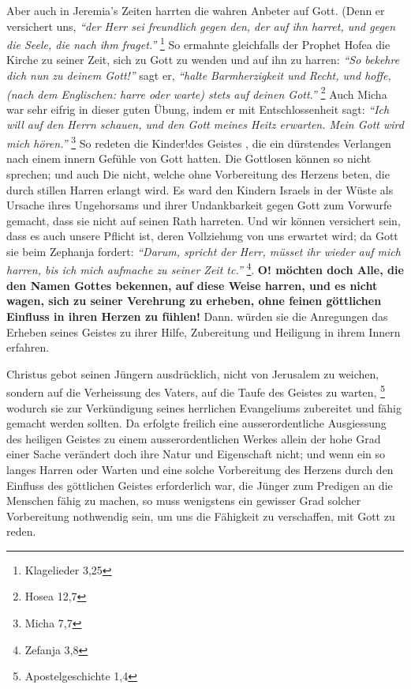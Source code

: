 \medskip

Aber auch in Jeremia’s  Zeiten harrten die wahren
Anbeter auf Gott. (Denn er
versichert uns,
\textit{ "`der Herr sei freundlich gegen den, der auf ihn harret, und
gegen die Seele, die nach ihm fraget."'}
\footnote{Klagelieder 3,25}
So ermahnte
gleichfalls der Prophet Hofea  die Kirche zu seiner Zeit,
sich zu Gott zu wenden
und auf ihn zu harren:
\textit{"`So bekehre dich nun zu deinem Gott!"'} sagt er,
\textit{"`halte
Barmherzigkeit und Recht, und hoffe, (nach dem Englischen: harre oder warte)
stets auf deinen Gott."'}
\footnote{Hosea 12,7}
Auch Micha  war sehr eifrig in
dieser guten Übung, indem er mit Entschlossenheit sagt:
\textit{"`Ich will auf den
Herrn schauen, und den Gott meines Heitz erwarten. Mein Gott wird mich
hören."'}
\footnote{Micha 7,7}
So redeten die Kinder!des Geistes , die ein
dürstendes Verlangen nach einem innern Gefühle von Gott hatten. Die Gottlosen
können so nicht sprechen; und auch Die nicht, welche ohne Vorbereitung des
Herzens beten, die durch stillen Harren erlangt wird. Es ward den Kindern
Israels  in der Wüste als Ursache ihres Ungehorsams und ihrer Undankbarkeit
gegen Gott zum Vorwurfe gemacht, dass sie nicht auf seinen Rath harreten. Und
wir können versichert sein, dass es auch unsere Pflicht ist, deren Vollziehung
von uns erwartet wird; da Gott sie beim Zephanja 
 fordert:
\textit{"`Darum, spricht
der Herr, müsset ihr wieder auf mich harren, bis ich mich aufmache zu seiner
Zeit tc."'}
\footnote{Zefanja 3,8}.
\textbf{O! möchten doch Alle, die den Namen
Gottes
bekennen, auf diese Weise harren, und es nicht wagen, sich zu seiner Verehrung
zu erheben, ohne feinen göttlichen Einfluss in ihren Herzen zu fühlen!} Dann.
würden sie die Anregungen das Erheben seines Geistes zu ihrer Hilfe, Zubereitung
und Heiligung in ihrem Innern erfahren.

\medskip
Christus gebot seinen Jüngern ausdrücklich, nicht von Jerusalem
 zu weichen,
sondern auf die Verheissung des Vaters, auf die Taufe des Geistes  zu
warten,
\footnote{Apostelgeschichte 1,4}
wodurch sie zur Verkündigung  seines herrlichen
Evangeliums zubereitet und fähig gemacht werden sollten. Da erfolgte freilich
eine ausserordentliche Ausgiessung  des heiligen Geistes zu
einem
ausserordentlichen Werkes allein der hohe Grad einer Sache verändert doch ihre
Natur und Eigenschaft nicht; und wenn ein so langes Harren oder Warten und eine
solche Vorbereitung des Herzens durch den Einfluss des göttlichen Geistes
erforderlich war, die Jünger zum Predigen an die Menschen fähig zu machen, so
muss wenigstens ein gewisser Grad solcher Vorbereitung nothwendig sein, um uns
die Fähigkeit zu verschaffen, mit Gott zu reden.


